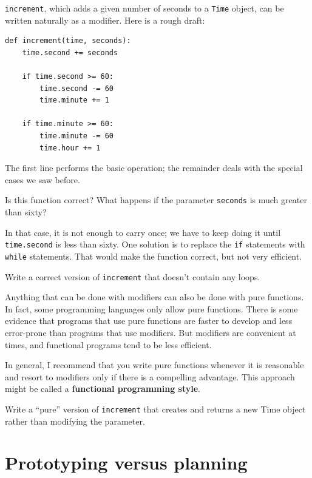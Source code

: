 \documentclass[10pt]{book}
\begin{document}
{

{\tt increment}, which adds a given number of seconds to a {\tt Time}
object, can be written naturally as a
modifier.  Here is a rough draft:

\beforeverb
\begin{verbatim}
def increment(time, seconds):
    time.second += seconds

    if time.second >= 60:
        time.second -= 60
        time.minute += 1

    if time.minute >= 60:
        time.minute -= 60
        time.hour += 1
\end{verbatim}
\afterverb
%
The first line performs the basic operation; the remainder deals
with the special cases we saw before.


Is this function correct?  What happens if the parameter {\tt seconds}
is much greater than sixty?  

In that case, it is not enough to carry
once; we have to keep doing it until {\tt time.second} is less than sixty.
One solution is to replace the {\tt if} statements with {\tt while}
statements.  That would make the function correct, but not
very efficient.

\begin{ex}
Write a correct version of {\tt increment} that
doesn't contain any loops.
\end{ex}

Anything that can be done with modifiers can also be done with pure
functions.  In fact, some programming languages only allow pure
functions.  There is some evidence that programs that use pure
functions are faster to develop and less error-prone than programs
that use modifiers.  But modifiers are convenient at times,
and functional programs tend to be less efficient.

In general, I recommend that you write pure functions whenever it is
reasonable and resort to modifiers only if there is a compelling
advantage.  This approach might be called a {\bf functional
programming style}.



\begin{ex}
Write a ``pure'' version of {\tt increment} that creates and returns
a new Time object rather than modifying the parameter.
\end{ex}


\section{Prototyping versus planning}
\label{prototype}

}
\end{document}
